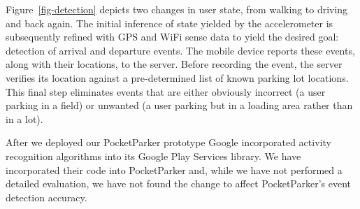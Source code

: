 Figure~\ref{fig-detection} depicts two changes in user state, from walking to
driving and back again.  The initial inference of state yielded by the
accelerometer is subsequently refined with GPS and WiFi sense data to yield
the desired goal:  detection of arrival and departure events.  The mobile
device reports these events, along with their locations, to the server.
Before recording the event, the server verifies its location against a
pre-determined list of known parking lot locations.  This final step
eliminates events that are either obviously incorrect (a user parking in a
field) or unwanted (a user parking but in a loading area rather than in a
lot).

After we deployed our PocketParker prototype Google incorporated activity
recognition algorithms into its Google Play Services library. We have
incorporated their code into PocketParker and, while we have not performed a
detailed evaluation, we have not found the change to affect PocketParker's
event detection accuracy.
